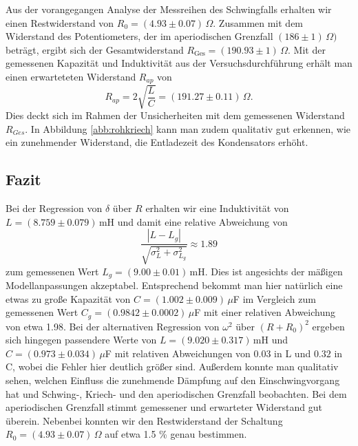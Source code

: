 \documentclass[a4paper, 12pt]{scrartcl}
\begin{document}
Aus der vorangegangen Analyse der Messreihen des Schwingfalls erhalten wir einen Restwiderstand von $R_0 = (4.93\pm0.07)\, \Omega$. Zusammen mit dem Widerstand des Potentiometers, der im aperiodischen Grenzfall $(186\pm 1)\, \Omega)$ beträgt, ergibt sich der Gesamtwiderstand $R_{\text{Ges}} = (190.93 \pm 1)\, \Omega$. Mit der gemessenen Kapazität und Induktivität aus der Versuchsdurchführung erhält man einen erwarteteten Widerstand $R_{ap}$ von
$$ R_{ap} = 2\sqrt{\frac{L}{C}} = (191.27 \pm 0.11) \,\Omega.$$
Dies deckt sich im Rahmen der Unsicherheiten mit dem gemessenen Widerstand $R_{Ges}$. In Abbildung \ref{abb:rohkriech} kann man zudem qualitativ gut erkennen, wie ein zunehmender Widerstand, die Entladezeit des Kondensators erhöht.


\subsection{Fazit}

Bei der Regression von $\delta$ über $R$ erhalten wir eine Induktivität von $L = (8.759 \pm 0.079) \,$mH und damit eine relative Abweichung von
$$\frac{|L-L_g|}{\sqrt{\sigma_L^2 + \sigma_{L_g}^2}} \approx 1.89$$
zum gemessenen Wert $L_g = (9.00 \pm 0.01)\,$mH. Dies ist angesichts der mäßigen Modellanpassungen akzeptabel. Entsprechend bekommt man hier natürlich eine etwas zu große Kapazität von $C = (1.002 \pm 0.009)\, \mu$F im Vergleich zum gemessenen Wert $C_g = (0.9842 \pm 0.0002)\,\mu$F mit einer relativen Abweichung von etwa 1.98. Bei der alternativen Regression von $\omega^2$ über $(R+R_0)^2$ ergeben sich hingegen passendere Werte von $L = (9.020 \pm 0.317) \,$mH und $C = (0.973 \pm 0.034)\,\mu$F mit relativen Abweichungen von $0.03$ in L und $0.32$ in C, wobei die Fehler hier deutlich größer sind. Außerdem konnte man qualitativ sehen, welchen Einfluss die zunehmende Dämpfung auf den Einschwingvorgang hat und Schwing-, Kriech- und den aperiodischen Grenzfall beobachten. Bei dem aperiodischen Grenzfall stimmt gemessener und erwarteter Widerstand gut überein. Nebenbei konnten wir den Restwiderstand der Schaltung $R_0 = (4.93 \pm 0.07) \,\Omega$ auf etwa 1.5 \% genau bestimmen. 



\newpage




\newpage
\appendix
\end{document}
